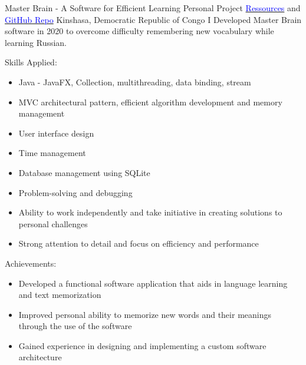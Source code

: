     {Master Brain - A Software for Efficient Learning}
    {Personal Project}
    {\href{https://disk.yandex.ru/d/T0gdYBeMfautMg}{\textcolor{blue}{Ressources}} and 
    \href{https://github.com/DanGlChris/Master-Brain}{\textcolor{blue}{GitHub Repo}} 
     Kinshasa, Democratic Republic of Congo
    }
    {
    \newline
    I Developed Master Brain software in 2020 to overcome difficulty remembering new vocabulary while learning Russian.    }
    {
    Skills Applied:
    \begin{itemize}
        \item Java - JavaFX,  Collection, multithreading, data binding, stream
        \item MVC architectural pattern, efficient algorithm development and memory management
        \item User interface design
        \item Time management
        \item Database management using SQLite
        \item Problem-solving and debugging
        \item Ability to work independently and take initiative in creating solutions to personal challenges
        \item Strong attention to detail and focus on efficiency and performance
    \end{itemize}
    Achievements:
    \begin{itemize}
        \item Developed a functional software application that aids in language learning and text memorization
        \item Improved personal ability to memorize new words and their meanings through the use of the software
        \item Gained experience in designing and implementing a custom software architecture
    \end{itemize}
    }

